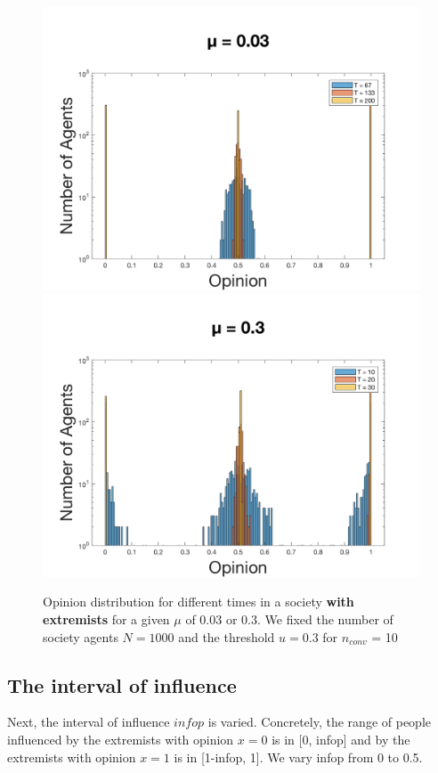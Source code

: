 \documentclass[11pt]{article}
\begin{document}
\begin{figure}[!htb]
  \includegraphics[width=\linewidth]{gen_plot_2017121418225017531e+01.png}
\endminipage\hfill
{}
  \includegraphics[width=\linewidth]{gen_plot_2017121418225354249e+01.png}
\endminipage
\caption{Opinion distribution for different times in a society \textbf{with extremists} for a given $\mu$ of 0.03 or 0.3. We fixed the number of society agents $N = 1000$ and the threshold $u = 0.3$ for $n_{conv}$ = 10}
\label{fig:muwithextremists}
\end{figure}


\subsection{The interval of influence}
Next, the interval of influence $infop$ is varied. Concretely, the range of people influenced by the extremists with opinion $x=0$ is in [0, infop] and by the extremists with opinion $x=1$ is in [1-infop, 1]. We vary infop from 0 to 0.5. 
\end{document}
